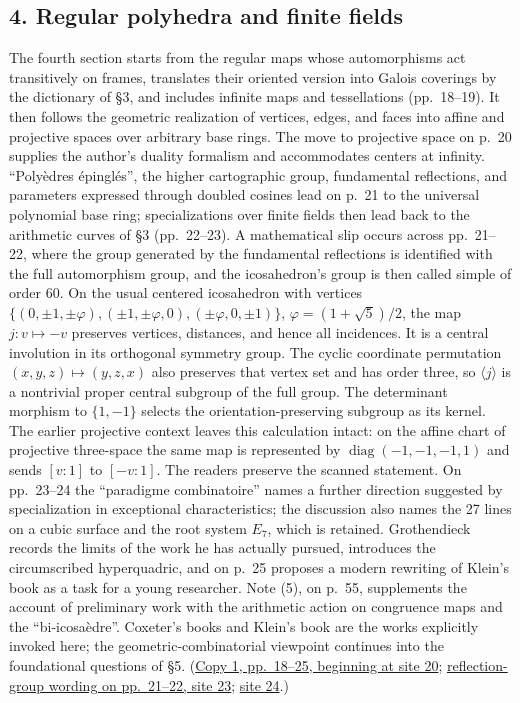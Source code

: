 \subsection*{4. Regular polyhedra and finite fields}
The fourth section starts from the regular maps whose automorphisms act
transitively on frames, translates their oriented version into Galois
coverings by the dictionary of \S3, and includes infinite maps and
tessellations (pp.~18--19). It then follows the geometric realization of
vertices, edges, and faces into affine and projective spaces over arbitrary
base rings. The move to projective space on p.~20 supplies the author's
duality formalism and accommodates centers at infinity. ``Polyèdres
épinglés'', the higher cartographic group, fundamental reflections, and
parameters expressed through doubled cosines lead on p.~21 to the
universal polynomial base ring; specializations over finite fields then
lead back to the arithmetic curves of \S3 (pp.~22--23). A mathematical
slip occurs across pp.~21--22, where the group generated by the fundamental
reflections is identified with the full automorphism group, and the
icosahedron's group is then called simple of order 60. On the usual
centered icosahedron with vertices
$\{(0,\pm1,\pm\varphi),(\pm1,\pm\varphi,0),(\pm\varphi,0,\pm1)\}$,
$\varphi=(1+\sqrt5)/2$, the map $j:v\mapsto-v$ preserves vertices,
distances, and hence all incidences. It is a central involution in its
orthogonal symmetry group. The cyclic coordinate permutation
$(x,y,z)\mapsto(y,z,x)$ also preserves that vertex set and has order three,
so $\langle j\rangle$ is a nontrivial proper central subgroup of the full
group. The determinant morphism to $\{1,-1\}$ selects the
orientation-preserving subgroup as its kernel. The earlier projective
context leaves this calculation intact: on the affine chart of projective
three-space the same map is represented by
$\operatorname{diag}(-1,-1,-1,1)$ and sends $[v:1]$ to $[-v:1]$.
The readers preserve the scanned statement. On pp.~23--24 the
``paradigme combinatoire'' names a further direction suggested by
specialization in exceptional characteristics; the discussion also names
the 27 lines on a cubic surface and the root system $E_7$, which is
retained. Grothendieck records the limits of the work he has actually
pursued, introduces the circumscribed hyperquadric, and on p.~25 proposes
a modern rewriting of Klein's book as a task for a young researcher.
Note (5), on p.~55, supplements the account of preliminary work with
the arithmetic action on congruence maps and the ``bi-icosaèdre''.
Coxeter's books and Klein's book are the works explicitly invoked here;
the geometric-combinatorial viewpoint continues into the foundational
questions of \S5.
(\href{https://grothendieck.umontpellier.fr/web/viewer.html?file=../119.pdf\#page=21}{Copy 1, pp.~18--25, beginning at site 20};
\href{https://grothendieck.umontpellier.fr/web/viewer.html?file=../119.pdf\#page=24}{reflection-group wording on pp.~21--22, site 23};
\href{https://grothendieck.umontpellier.fr/web/viewer.html?file=../119.pdf\#page=25}{site 24}.)

